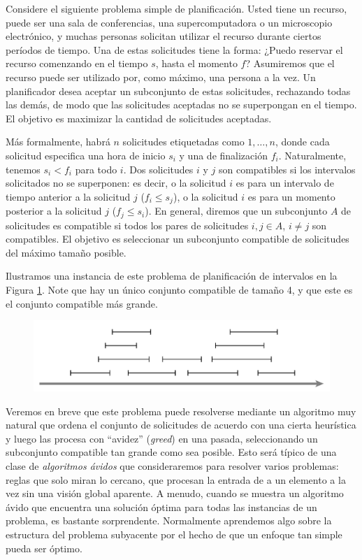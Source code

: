 \documentclass[a4paper, 12pt]{book}
\begin{document}
Considere el siguiente problema simple de planificación. Usted tiene un recurso, puede ser una sala de conferencias, una supercomputadora o un microscopio electrónico, y muchas personas solicitan utilizar el recurso durante ciertos períodos de tiempo. Una de estas solicitudes tiene la forma: ¿Puedo reservar el recurso comenzando en el tiempo $s$, hasta el momento $f$? Asumiremos que el recurso puede ser utilizado por, como máximo, una persona a la vez. Un planificador desea aceptar un subconjunto de estas solicitudes, rechazando todas las demás, de modo que las solicitudes aceptadas no se superpongan en el tiempo. El objetivo es maximizar la cantidad de solicitudes aceptadas.

Más formalmente, habrá $n$ solicitudes etiquetadas como $1,\dots, n$, donde cada solicitud especifica una hora de inicio $s_i$ y una de finalización $f_i$. Naturalmente, tenemos $s_i < f_i$ para todo $i$. Dos solicitudes $i$ y $j$ son compatibles si los intervalos solicitados no se superponen: es decir, o la solicitud $i$ es para un intervalo de tiempo anterior a la solicitud $j$ ($f_i \leq s_j$), o la solicitud $i$ es para un momento posterior a la solicitud $j$ ($f_j \leq s_i$). En general, diremos que un subconjunto $A$ de solicitudes es compatible si todos los pares de solicitudes $i,j \in A$, $i \neq j$ son compatibles. El objetivo es seleccionar un subconjunto compatible de solicitudes del máximo tamaño posible.

Ilustramos una instancia de este problema de planificación de intervalos en la Figura \ref{fig:fig1-4}. Note que hay un único conjunto compatible de tamaño 4, y que este es el conjunto compatible más grande.

\begin{figure}[h]
    \centering
    \includegraphics[width=.8\textwidth]{Imagenes-Seccion1/fig1-4.PNG}
\label{fig:fig1-4}
\end{figure}

Veremos en breve que este problema puede resolverse mediante un algoritmo muy natural que ordena el conjunto de solicitudes de acuerdo con una cierta heurística y luego las procesa con ``avidez'' (\textit{greed}) en una pasada, seleccionando un subconjunto compatible tan grande como sea posible. Esto será típico de una clase de \textit{algoritmos ávidos} que consideraremos para resolver varios problemas: reglas que solo miran lo cercano, que procesan la entrada de a un elemento a la vez sin una visión global aparente. A menudo, cuando se muestra un algoritmo ávido que encuentra una solución óptima para todas las instancias de un problema, es bastante sorprendente. Normalmente aprendemos algo sobre la estructura del problema subyacente por el hecho de que un enfoque tan simple pueda ser óptimo.
\end{document}
